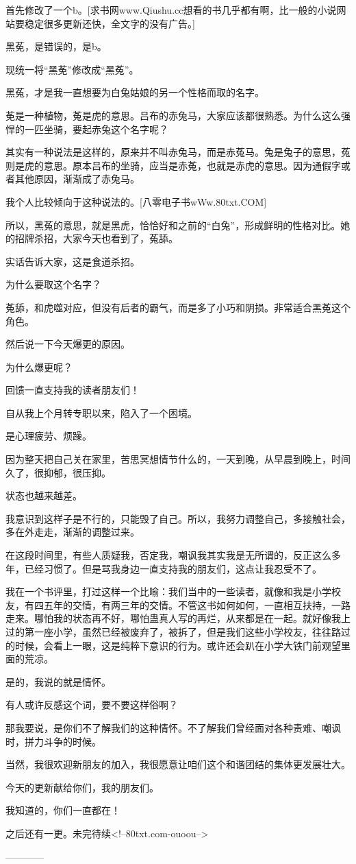 \begin{this_body}
首先修改了一个b。[求书网www.Qiushu.cc想看的书几乎都有啊，比一般的小说网站要稳定很多更新还快，全文字的没有广告。]

黑莬，是错误的，是b。

现统一将“黑莬”修改成“黑菟”。

黑菟，才是我一直想要为白兔姑娘的另一个性格而取的名字。

莬是一种植物，菟是虎的意思。吕布的赤兔马，大家应该都很熟悉。为什么这么强悍的一匹坐骑，要起赤兔这个名字呢？

其实有一种说法是这样的，原来并不叫赤兔马，而是赤菟马。兔是兔子的意思，菟则是虎的意思。原本吕布的坐骑，应当是赤菟，也就是赤虎的意思。因为通假字或者其他原因，渐渐成了赤兔马。

我个人比较倾向于这种说法的。[八零电子书wWw.80txt.COM]

所以，黑菟的意思，就是黑虎，恰恰好和之前的“白兔”，形成鲜明的性格对比。她的招牌杀招，大家今天也看到了，菟舔。

实话告诉大家，这是食道杀招。

为什么要取这个名字？

菟舔，和虎噬对应，但没有后者的霸气，而是多了小巧和阴损。非常适合黑菟这个角色。

然后说一下今天爆更的原因。

为什么爆更呢？

回馈一直支持我的读者朋友们！

自从我上个月转专职以来，陷入了一个困境。

是心理疲劳、烦躁。

因为整天把自己关在家里，苦思冥想情节什么的，一天到晚，从早晨到晚上，时间久了，很抑郁，很压抑。

状态也越来越差。

我意识到这样子是不行的，只能毁了自己。所以，我努力调整自己，多接触社会，多在外走走，渐渐的调整过来。

在这段时间里，有些人质疑我，否定我，嘲讽我其实我是无所谓的，反正这么多年，已经习惯了。但是骂我身边一直支持我的朋友们，这点让我忍受不了。

我在一个书评里，打过这样一个比喻：我们当中的一些读者，就像和我是小学校友，有四五年的交情，有两三年的交情。不管这书如何如何，一直相互扶持，一路走来。哪怕我的状态再不好，哪怕蛊真人写的再烂，从来都是在一起。就好像我上过的第一座小学，虽然已经被废弃了，被拆了，但是我们这些小学校友，往往路过的时候，会看上一眼，这是纯粹下意识的行为。或许还会趴在小学大铁门前观望里面的荒凉。

是的，我说的就是情怀。

有人或许反感这个词，要不要这样俗啊？

那我要说，是你们不了解我们的这种情怀。不了解我们曾经面对各种责难、嘲讽时，拼力斗争的时候。

当然，我很欢迎新朋友的加入，我很愿意让咱们这个和谐团结的集体更发展壮大。

今天的更新献给你们，我的朋友们。

我知道的，你们一直都在！

之后还有一更。未完待续<!--80txt.com-ouoou-->

------------

\end{this_body}

